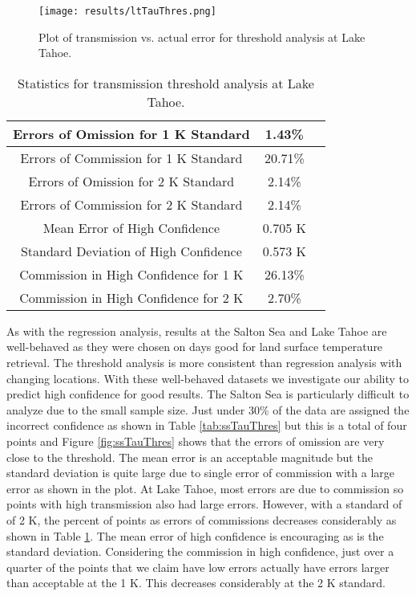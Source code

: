 \documentclass{book}
\begin{document}
\begin{minipage}[c]{0.47\textwidth}
\centering
\begin{figure}[H]
\texttt{[image: results/ltTauThres.png]}
\caption{Plot of transmission vs. actual error for threshold analysis at Lake Tahoe.}
\label{fig:ltTauThres}
\end{figure}
\end{minipage}
\begin{minipage}[c]{0.47\textwidth}
\begin{table}[H]
\centering
\footnotesize
\begin{tabular}{ | c | c | c | } \hline
Errors of Omission for 1 K Standard & 1.43\% \\ \hline
Errors of Commission for 1 K Standard & 20.71\% \\ \hline
Errors of Omission for 2 K Standard & 2.14\% \\ \hline
Errors of Commission for 2 K Standard & 2.14\% \\ \hline
Mean Error of High Confidence & 0.705 K \\ \hline
Standard Deviation of High Confidence & 0.573 K \\ \hline
Commission in High Confidence for 1 K & 26.13\% \\ \hline
Commission in High Confidence for 2 K & 2.70\% \\ \hline
\end{tabular}
\caption{Statistics for transmission threshold analysis at Lake Tahoe.}
\label{tab:ltTauThres}
\end{table}
\end{minipage}

As with the regression analysis, results at the Salton Sea and Lake Tahoe are well-behaved as they were chosen on days good for land surface temperature retrieval.  The threshold analysis is more consistent than regression analysis with changing locations.  With these well-behaved datasets we investigate our ability to predict high confidence for good results.  The Salton Sea is particularly difficult to analyze due to the small sample size.  Just under 30\% of the data are assigned the incorrect confidence as shown in Table \ref{tab:ssTauThres} but this is a total of four points and Figure \ref{fig:ssTauThres} shows that the errors of omission are very close to the threshold.  The mean error is an acceptable magnitude but the standard deviation is quite large due to single error of commission with a  large error as shown in the plot.  At Lake Tahoe, most errors are due to commission so points with high transmission also had large errors.  However, with a standard of of 2 K, the percent of points as errors of commissions decreases considerably as shown in Table \ref{tab:ltTauThres}.  The mean error of high confidence is encouraging as is the standard deviation.  Considering the commission in high confidence, just over a quarter of the points that we claim have low errors actually have errors larger than acceptable at the 1 K.  This decreases considerably at the 2 K standard.
\end{document}
